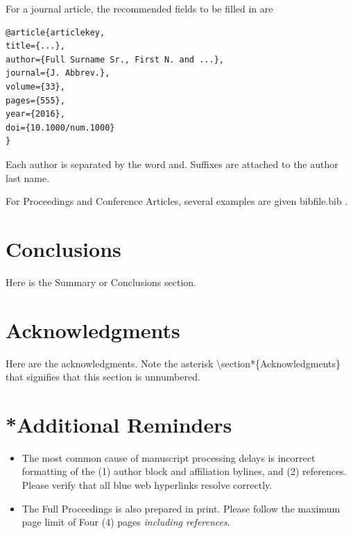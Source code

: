 \documentclass[10pt,a4paper,twoside]{article}
\begin{document}
For a journal article, the recommended fields to be filled in are
\begin{verbatim}
@article{articlekey,
title={...},
author={Full Surname Sr., First N. and ...},
journal={J. Abbrev.},
volume={33},
pages={555},
year={2016},
doi={10.1000/num.1000}
}
\end{verbatim}
Each author is separated by the word {\ttfamily and}. Suffixes are attached to the author last name.

For Proceedings and Conference Articles, several examples are given {\ttfamily bibfile}.{\ttfamily bib} \cite{proceedingskey1,proceedingskey2}.

\section{Conclusions}
Here is the Summary or Conclusions section.

\section*{Acknowledgments}
Here are the acknowledgments. Note the asterisk \textbackslash{\ttfamily section*}\{{\ttfamily Acknowledgments}\} that signifies that this section is unnumbered.

\section*{*Additional Reminders}
\begin{itemize}
    \item The most common cause of manuscript processing delays is incorrect formatting of the (1) author block and affiliation bylines, and (2) references. Please verify that all blue web hyperlinks resolve correctly.
    \item The Full Proceedings is also prepared in print. Please follow the maximum page limit of Four (4) pages \textit{including references}. 
\end{itemize}



\end{document}
